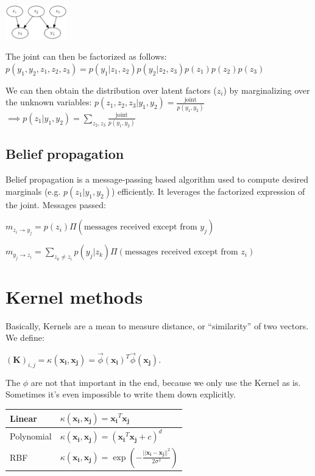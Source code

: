 \documentclass[10pt,a4paper,landscape]{article}
\providecommand{\bf}[1]{\ensuremath{\mathbf{#1}}}
\begin{document}
\begin{multicols*}{4}
\begin{colfig}
  \centering
  \includegraphics[height=1.5cm]{images/bayesian-network.png}
\end{colfig}

The joint can then be factorized as follows:
$p(y_1, y_2, z_1, z_2, z_3) = p(y_1 | z_1, z_2) p(y_2 | z_2, z_3) p(z_1) p(z_2) p(z_3)$

We can then obtain the distribution over latent factors ($z_i$) by marginalizing over the unknown variables:
$p(z_1, z_2, z_3 | y_1, y_2) = \frac{\text{joint}}{p(y_1, y_2)}$\\
$\implies p(z_1 | y_1, y_2) = \sum_{z_2, z_3} \frac{\text{joint}}{p(y_1, y_2)}$

\subsection{Belief propagation}
Belief propagation is a message-passing based algorithm used to compute desired marginals (e.g. $p(z_1 | y_1, y_2)$) efficiently. It leverages the factorized expression of the joint. Messages passed:

$m_{z_i \rightarrow y_j} = p(z_i) \Pi(\text{messages received except from } y_j)$

$m_{y_j \rightarrow z_i} = \sum_{z_k \neq z_i} p(y_j | z_k) \Pi(\text{messages received except from } z_i)$

\section{Kernel methods}
Basically, Kernels are a mean to measure distance, or ``similarity'' of two vectors. We define:

$(\bf{K})_{i,j} = \kappa(\bf{x_i}, \bf{x_j}) = \vec \phi(\bf{x_i})^T \vec \phi(\bf{x_j})$.

The $\phi$ are not that important in the end, because we only use the Kernel as is. Sometimes it's even impossible to write them down explicitly.

\begin{tabular}{ l | l }
  \hline
  Linear     & $\kappa(\bf{x_i}, \bf{x_j}) = \bf{x_i}^T \bf{x_j}$ \\
  \hline
  Polynomial & $\kappa(\bf{x_i}, \bf{x_j}) = (\bf{x_i}^T \bf{x_j} + c)^d$ \\
  \hline
  RBF        & $\kappa(\bf{x_i}, \bf{x_j}) = \exp\left(-\frac{||\bf{x_i} - \bf{x_j}||^2}{2\sigma^2}\right)$ \\
  \hline
\end{tabular}


\end{multicols*}
\end{document}
